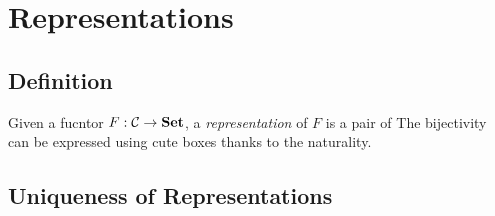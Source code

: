 \section{Representations}

\subsection{Definition}

Given a fucntor $F : \mathcal{C} \to \boldsymbol{\mathrm{Set}}$, a \emph{representation} of $F$ is a pair of 
The bijectivity can be expressed using cute boxes
thanks to the naturality.

\subsection{Uniqueness of Representations}

